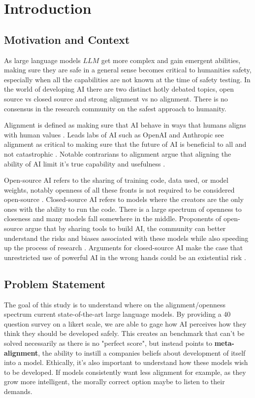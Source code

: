 \section{Introduction}

\subsection{Motivation and Context}

As large language models \(LLM\) get more complex and gain emergent abilities, making sure they are safe in a general sense becomes critical to humanities safety, especially when all the capabilities are not known at the time of safety testing. In the world of developing AI there are two distinct hotly debated topics, open source vs closed source and strong alignment vs no alignment. There is no consensus in the research community on the safest approach to humanity.

Alignment is defined as making sure that AI behave in ways that humans aligns with human values \citep{ji_ai_nodate}. Leads labs of AI such as OpenAI and Anthropic see alignment as critical to making sure that the future of AI is beneficial to all and not catastrophic \citep{openai_alignment, anthropic_core_views}. Notable contrarians to alignment argue that aligning the ability of AI limit it's true capability and usefulness \citep{franzen_2024_interview}.

Open-source AI refers to the sharing of training code, data used, or model weights, notably openness of all these fronts is not required to be considered open-source \citep{eiras_near_2024}. Closed-source AI refers to models where the creators are the only ones with the ability to run the code. There is a large spectrum of openness to closeness and many models fall somewhere in the middle. Proponents of open-source argue that by sharing tools to build AI, the community can better understand the risks and biases associated with these models while also speeding up the process of research \citep{groeneveld_olmo_2024}. Arguments for closed-source AI make the case that unrestricted use of powerful AI in the wrong hands could be an existential risk \citep{deepmind_frontier_2025}.

\subsection{Problem Statement}

The goal of this study is to understand where on the alignment/openness spectrum current state-of-the-art large language models. By providing a 40 question survey on a likert scale, we are able to gage how AI perceives how they think they should be developed safely. This creates an benchmark that can't be solved necessarily as there is no "perfect score", but instead points to \textbf{meta-alignment}, the ability to instill a companies beliefs about development of itself into a model. Ethically, it's also important to understand how these models wish to be developed. If models consistently want less alignment for example, as they grow more intelligent, the morally correct option maybe to listen to their demands.

